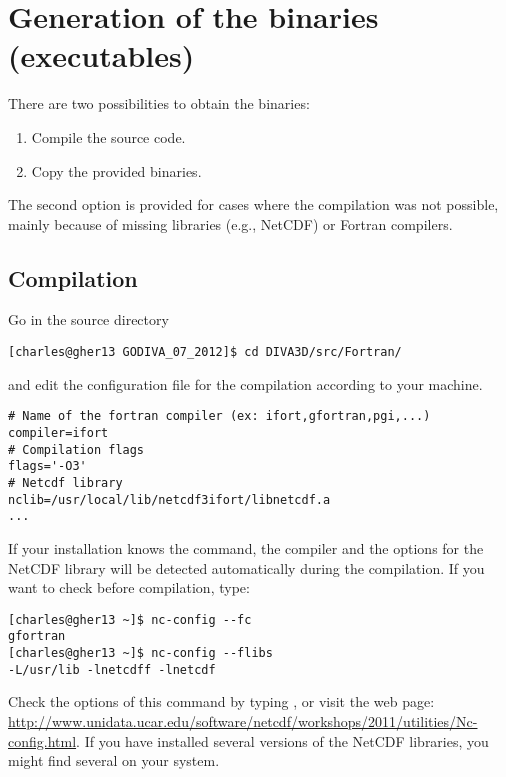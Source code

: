 \section{Generation of the binaries (executables)}

There are two possibilities to obtain the binaries: 
\begin{enumerate}
\item Compile the source code.
\item Copy the provided binaries.
\end{enumerate}
The second option is provided for cases where the compilation was not possible, mainly because of missing libraries (e.g., NetCDF) or Fortran compilers.

\subsection{Compilation\label{sec:compilation}}
Go in the source directory 
\begin{lstlisting}[style=Bash]
[charles@gher13 GODIVA_07_2012]$ cd DIVA3D/src/Fortran/
\end{lstlisting}
and edit the configuration file  for the compilation  according to your machine. 

\begin{verbatim}
# Name of the fortran compiler (ex: ifort,gfortran,pgi,...)
compiler=ifort
# Compilation flags
flags='-O3'
# Netcdf library
nclib=/usr/local/lib/netcdf3ifort/libnetcdf.a
...
\end{verbatim}

If your installation knows the  command, the compiler and the options for the NetCDF library will be detected automatically during the compilation. If you want to check before compilation, type:
\begin{lstlisting}[style=Bash]
[charles@gher13 ~]$ nc-config --fc
gfortran
[charles@gher13 ~]$ nc-config --flibs
-L/usr/lib -lnetcdff -lnetcdf
\end{lstlisting}
Check the options of this command by typing , or visit the web page: \url{http://www.unidata.ucar.edu/software/netcdf/workshops/2011/utilities/Nc-config.html}. If you have installed several versions of the NetCDF libraries, you might find several  on your system.


